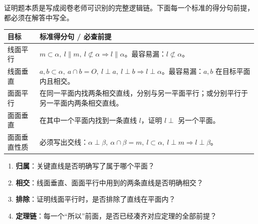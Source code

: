 \documentclass[11pt,a4paper]{ctexart}
\begin{document}
\begin{tcolorbox}[enhanced,breakable,colback=white,colframe=rulecolor,boxrule=0.55pt,arc=1mm,left=1.4mm,right=1.4mm,top=1.1mm,bottom=1.1mm,title={核心要求：看出来不等于证明出来},fonttitle=\bfseries]
证明题本质是写成阅卷老师可识别的完整逻辑链。下面每一个标准的得分句前提，都必须在解答中写全。
\end{tcolorbox}

\vspace{0.4em}
\begin{tabularx}{\textwidth}{p{3.2cm}X}
\toprule
目标 & 标准得分句 / 必查前提 \\
\midrule
线面平行 & $m\subset\alpha,\ l\parallel m,\ l\not\subset\alpha\Rightarrow l\parallel\alpha$。最容易漏：$l\not\subset\alpha$。 \\ \hline
线面垂直 & $a,b\subset\alpha,\ a\cap b=O,\ l\perp a,\ l\perp b\Rightarrow l\perp\alpha$。最容易漏：$a,b$ 在目标平面内且相交。 \\ \hline
面面平行 & 在同一平面内找两条相交直线，分别与另一平面平行；或分别平行于另一平面内两条相交直线。 \\ \hline
面面垂直 & 在其中一个平面内找到一条直线 $l$，证明 $l\perp$ 另一个平面。 \\ \hline
面面垂直性质 & 必须写出交线：$\alpha\perp\beta,\ \alpha\cap\beta=m,\ l\subset\alpha,\ l\perp m\Rightarrow l\perp\beta$。 \\
\bottomrule
\end{tabularx}
\vspace{0.6em}

\begin{tcolorbox}[colback=softblue,colframe=teachblue,boxrule=0.7pt,arc=1.2mm,left=1.4mm,right=1.4mm,top=1.2mm,bottom=1.2mm,title={四步自查：每次写完证明后都扫一遍},fonttitle=\bfseries]
\begin{enumerate}[label=\arabic*. , leftmargin=2em, itemsep=0.1em]
  \item \textbf{归属}：关键直线是否明确写了属于哪个平面？
  \item \textbf{相交}：线面垂直、面面平行中用到的两条直线是否明确相交？
  \item \textbf{排除}：证明线面平行时，是否排除了直线在平面内？
  \item \textbf{定理链}：每一个“所以”前面，是否已经凑齐对应定理的全部前提？
\end{enumerate}
\end{tcolorbox}

\newpage

\end{document}
